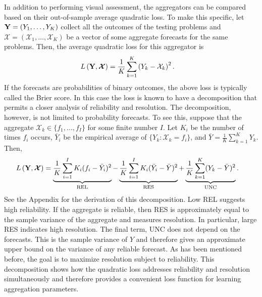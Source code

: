\documentclass[11pt]{article}
\theoremstyle{definition}
\theoremstyle{definition}
\def\Y{{\bf Y}}
\begin{document}
In addition to performing visual assessment, the aggregators can be compared based on their out-of-sample average quadratic loss. To make this specific, let $\Y = (Y_1, \dots, Y_K)$ collect all the outcomes of the testing problems and $\boldsymbol{\mathcal{X}} = (\mathcal{X}_1, \dots, \mathcal{X}_K)$ be a vector of some aggregate forecasts for the same problems. Then, the average quadratic loss for this aggregator is
\begin{align*}
L\left(\Y, \boldsymbol{\mathcal{X}}\right) &= \frac{1}{K} \sum_{k=1}^K \left(Y_k - \mathcal{X}_k\right)^2.
\end{align*}
If the forecasts are probabilities of binary outcomes, the above loss is typically called the Brier score. In this case the loss is known to have a decomposition that permits a closer analysis of  reliability and resolution. The decomposition, however, is not limited to probability forecasts. To see this, suppose that the aggregate $\mathcal{X}_k \in \{f_1, \dots, f_I\}$ for some finite number $I$. Let $K_i$ be the number of times $f_i$ occurs, $\bar{Y}_i$ be the empirical average of $\{Y_k : \mathcal{X}_k = f_i\}$, and $\bar{Y} = \frac{1}{K} \sum_{k=1}^K Y_k$. Then,
\begin{align}
L\left(\Y, \boldsymbol{\mathcal{X}} \right)  &= \underbrace{\frac{1}{K} \sum_{i=1}^I K_i(f_i - \bar{Y}_i)^2}_\text{REL} - \underbrace{\frac{1}{K} \sum_{i=1}^I K_i(\bar{Y}_i-\bar{Y})^2}_\text{RES} + \underbrace{\frac{1}{K} \sum_{k=1}^K (Y_k - \bar{Y})^2}_\text{UNC}. \label{decomposition}
\end{align}
See the Appendix for the derivation of this decomposition. Low REL suggests high reliability. If the aggregate is reliable, then RES is approximately equal to the sample variance of the aggregate and measures resolution. In particular, large RES indicates high resolution. The final term, UNC does not depend on the forecasts. This is the sample variance of $Y$ and therefore gives an approximate upper bound on the variance of any reliable forecast. As has been mentioned before, the goal is to maximize resolution subject to reliability. This decomposition shows how the quadratic loss addresses reliability and resolution simultaneously and therefore provides a convenient loss function for learning aggregation parameters. 
\end{document}

